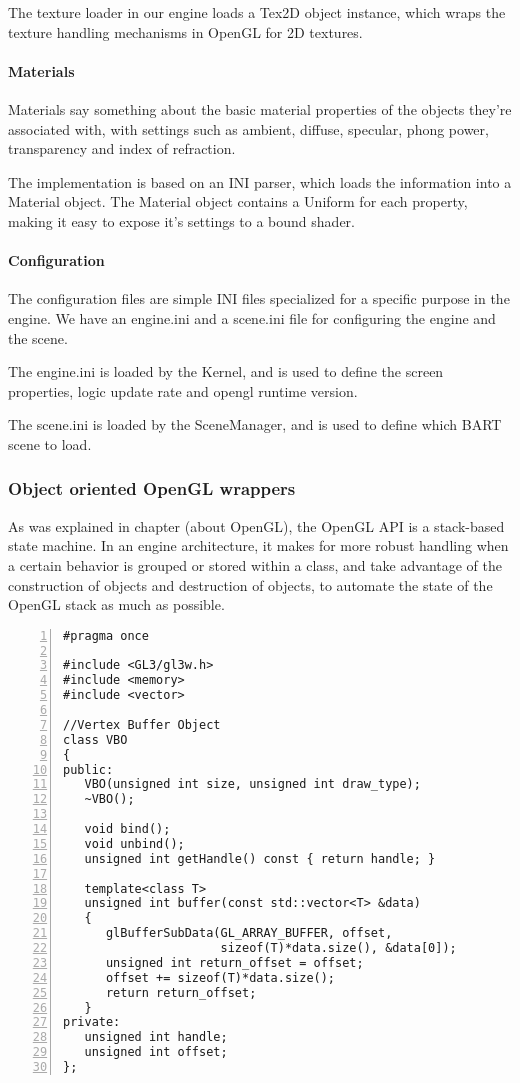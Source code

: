 The texture loader in our engine loads a Tex2D object instance, which wraps the texture handling mechanisms in OpenGL for 2D textures.

\paragraph{Materials}
Materials say something about the basic material properties of the objects they're associated with, with settings such as ambient, diffuse, specular, phong power, transparency and index of refraction.

The implementation is based on an INI parser, which loads the information into a Material object. The Material object contains a Uniform for each property, making it easy to expose it's settings to a bound shader.

\paragraph{Configuration}
The configuration files are simple INI files specialized for a specific purpose in the engine. We have an engine.ini and a scene.ini file for configuring the engine and the scene.

The engine.ini is loaded by the Kernel, and is used to define the screen properties, logic update rate and opengl runtime version.

The scene.ini is loaded by the SceneManager, and is used to define which BART scene to load.

\subsubsection{Object oriented OpenGL wrappers}
As was explained in chapter (about OpenGL), the OpenGL API is a stack-based state machine. In an engine architecture, it makes for more robust handling when a certain behavior is grouped or stored within a class, and take advantage of the construction of objects and destruction of objects, to automate the state of the OpenGL stack as much as possible.

\begin{Verbatim}[frame=single, numbers=left, label=VBO header]
#pragma once

#include <GL3/gl3w.h>
#include <memory>
#include <vector>

//Vertex Buffer Object
class VBO
{
public:
   VBO(unsigned int size, unsigned int draw_type);
   ~VBO();

   void bind();
   void unbind();
   unsigned int getHandle() const { return handle; }

   template<class T>
   unsigned int buffer(const std::vector<T> &data)
   {
      glBufferSubData(GL_ARRAY_BUFFER, offset, 
                      sizeof(T)*data.size(), &data[0]);
      unsigned int return_offset = offset;
      offset += sizeof(T)*data.size();
      return return_offset;
   }
private:
   unsigned int handle;
   unsigned int offset;
};
\end{Verbatim}

